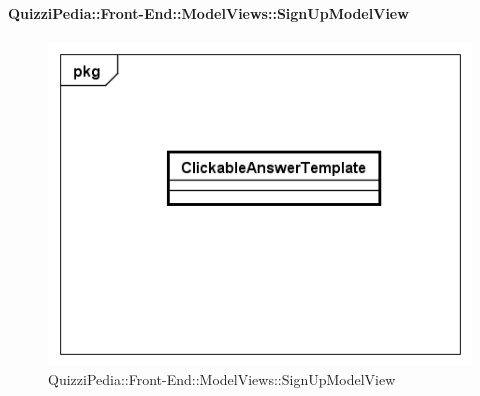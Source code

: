 	\paragraph{QuizziPedia::Front-End::ModelViews::SignUpModelView}
	
	\label{QuizziPedia::Front-End::ModelViews::SignUpModelView}
	
	\begin{figure}[ht]
		\centering
		\includegraphics[scale=0.5,keepaspectratio]{UML/Classi/Front-End/QuizziPedia_Front-end_Templates_ClickableAnswerTemplate.png}
		\caption{QuizziPedia::Front-End::ModelViews::SignUpModelView}
	\end{figure} \FloatBarrier
	
